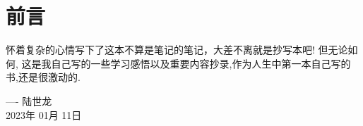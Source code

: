 \thispagestyle{empty}
\chapter*{前言}
怀着复杂的心情写下了这本不算是笔记的笔记，大差不离就是抄写本吧! 但无论如何, 这是我自己写的一些学习感悟以及重要内容抄录,作为人生中第一本自己写的书,还是很激动的.


\hfill ---- 陆世龙\\ 
 \phantom{\rule{.8\linewidth+.1em}{0pt}}  2023年 01月 11日
\let\cleardoublepage\clearpage